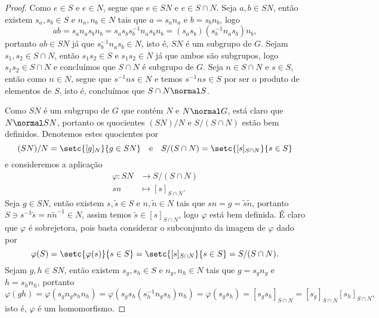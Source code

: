 \begin{proof}
    Como \(e \in S\) e \(e \in N\), segue que \(e \in SN\) e \(e \in S \cap N\). Seja \(a,b \in SN\), então existem \(s_a, s_b \in S\) e \(n_a, n_b \in N\) tais que \(a = s_a n_a\) e \(b = s_b n_b\), logo
    \begin{equation*}
        ab = s_a n_a s_b n_b = s_a s_b s_b^{-1} n_a s_b n_b = (s_a s_b) (s_b^{-1} n_a s_b) n_b,
    \end{equation*}
    portanto \(ab \in SN\) já que \(s_b^{-1} n_a s_b \in N\), isto é, \(SN\) é um subgrupo de \(G\). Sejam \(s_1, s_2 \in S\cap N\), então \(s_1 s_2 \in S\) e \(s_1 s_2 \in N\) já que ambos são subgrupos, logo \(s_1 s_2 \in S \cap N\) e concluímos que \(S\cap N\) é subgrupo de \(G\). Seja \(n \in S \cap N\) e \(s \in S\), então como \(n \in N\), segue que \(s^{-1}ns \in N\) e temos \(s^{-1} n s \in S\) por ser o produto de elementos de \(S\), isto é, concluímos que \(S \cap N \normal S\).

    Como \(SN\) é um subgrupo de \(G\) que contém \(N\) e \(N \normal G\), está claro que \(N \normal SN\), portanto os quocientes \((SN)/N\) e \(S/(S \cap N)\) estão bem definidos. Denotemos estes quocientes por
    \begin{equation*}
        (SN)/N = \setc{[g]_N}{g \in SN}\quad\text{e}\quad S/(S \cap N) = \setc{[s]_{S\cap N}}{s \in S}
    \end{equation*}
    e consideremos a aplicação
    \begin{align*}
        \varphi : SN &\to S/(S \cap N)\\
                  sn &\mapsto [s]_{S \cap N}.
    \end{align*}
    Seja \(g \in SN\), então existem \(s, \tilde{s} \in S\) e \(n, \tilde{n} \in N\) tais que \(sn = g = \tilde{s} \tilde{n}\), portanto \(S \ni s^{-1}\tilde{s} = n\tilde{n}^{-1} \in N\), assim temos \(\tilde{s} \in [s]_{S \cap N}\), logo \(\varphi\) está bem definida. É claro que \(\varphi\) é sobrejetora, pois basta considerar o subconjunto da imagem de \(\varphi\) dado por
    \begin{equation*}
        \varphi(S) = \setc{\varphi(s)}{s \in S} = \setc{[s]_{S \cap N}}{s \in S} = S / (S \cap N).
    \end{equation*}
    Sejam \(g, h \in SN\), então existem \(s_g, s_h \in S\) e \(n_g, n_h \in N\) tais que \(g = s_g n_g\) e \(h = s_h n_h\), portanto
    \begin{equation*}
        \varphi(gh) = \varphi(s_g n_g s_h n_h) = \varphi\left(s_g s_h (s_h^{-1}n_g s_h)n_h\right) = \varphi(s_g s_h) = [s_gs_h]_{S\cap N} = [s_g]_{S \cap N} [s_h]_{S\cap N},
    \end{equation*}
    isto é, \(\varphi\) é um homomorfismo.


\end{proof}
